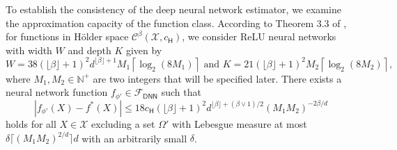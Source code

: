 \documentclass[
  12pt]{article}
\begin{document}
To establish the consistency of the deep neural network estimator, we examine the approximation capacity of the function class. According to Theorem 3.3 of \cite{jiao_deepnonparametric}, for functions in Hölder space $\mathcal{C}^\beta(\mathcal{X}, c_{\mathsf{H}})$, we consider ReLU neural networks with width $W$ and depth $K$ given by
$$W=38(\lfloor\beta\rfloor+1)^2 d^{\lfloor\beta\rfloor+1} M_1\left\lceil\log _2(8 M_1)\right\rceil \text { and } K=21(\lfloor\beta\rfloor+1)^2 M_2\left\lceil\log _2(8 M_2)\right\rceil,$$
\noindent where $M_1, M_2 \in \mathbb{N}^{+}$ are two integers that will be specified later. There exists a neural network function $f_{\phi'} \in \mathcal{F}_{\mathsf{DNN}}$ such that
\begin{equation}\label{jiao_approx}
\left|f_{\phi'}(X)-f^*(X)\right| \leq 18 c_{\mathsf{H}}(\lfloor\beta\rfloor+1)^2 d^{\lfloor\beta\rfloor+(\beta \vee 1) / 2}(M_1 M_2)^{-2 \beta / d}
\end{equation}
holds for all $X \in \mathcal{X}$ excluding a set $\Omega'$ with Lebesgue measure at most $\delta \lceil(M_1 M_2)^{2 / d}\rceil d$ with an arbitrarily small $\delta$.
\end{document}
